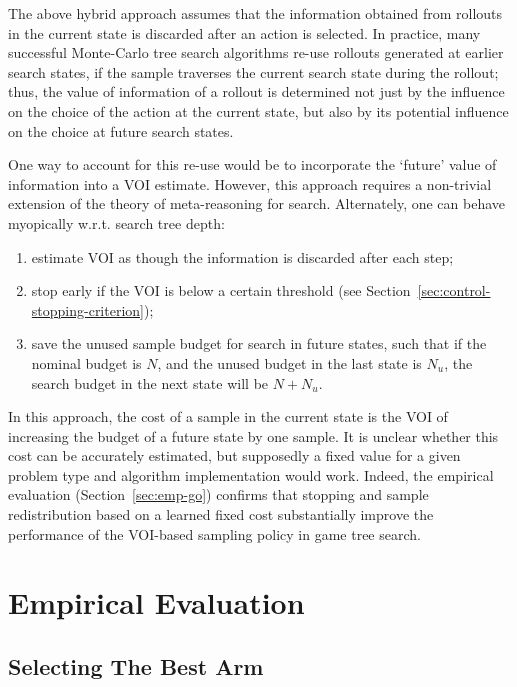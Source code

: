 \documentclass[]{article}
\begin{document}
The above hybrid approach assumes
that the information obtained from rollouts in the
current state is discarded after an action is selected. In practice,
many successful Monte-Carlo tree search algorithms re-use rollouts
generated at earlier search states, if the sample traverses the
current search state during the rollout; thus, the value of information of a rollout is
determined not just by the influence on the choice of the action at
the current state, but also by its potential influence on the choice at future
search states.

One way to account for this re-use would be to incorporate the
`future' value of information into a VOI estimate. However, this 
approach requires a non-trivial extension of the theory of meta-reasoning for search.
Alternately, one can behave myopically w.r.t. search tree depth:
\begin{enumerate}
\item estimate VOI as though the information is discarded after each step;
\item stop early if the VOI is below a certain threshold
   (see Section~\ref{sec:control-stopping-criterion});
\item save the unused sample budget for search in future states, such that
   if the nominal budget is $N$, and the unused budget in the last state
   is $N_u$, the search budget in the next state will be $N+N_u$.
\end{enumerate}
In this approach, the cost of a sample in the current state is the
VOI of increasing the budget of a future state by one sample.  It is
unclear whether this cost can be accurately estimated, but supposedly
a fixed value for a given problem type and algorithm implementation
would work. Indeed, the empirical evaluation (Section~\ref{sec:emp-go})
confirms that stopping and sample redistribution based on a learned
fixed cost  substantially improve the performance of the VOI-based
sampling policy in game tree search.

\section{Empirical Evaluation}
\label{sec:empirical-evaluation}

\subsection{Selecting The Best Arm}
\label{sec:emp-arm}
\end{document}
